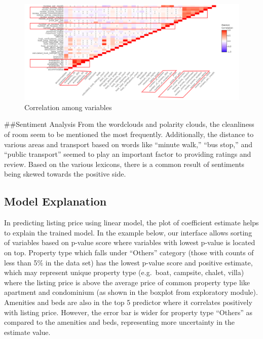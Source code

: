 \documentclass{acm_proc_article-sp}
\begin{document}
\begin{figure}[H]

{\centering \includegraphics[width=1\linewidth]{images/corrcase} 

}

\caption{Correlation among variables}\label{fig:unnamed-chunk-20}
\end{figure}

\#\#Sentiment Analysis From the wordclouds and polarity clouds, the
cleanliness of room seem to be mentioned the most frequently.
Additionally, the distance to various areas and transport based on words
like ``minute walk,'' ``bus stop,'' and ``public transport'' seemed to
play an important factor to providing ratings and review. Based on the
various lexicons, there is a common result of sentiments being skewed
towards the positive side.

\hypertarget{model-explanation}{%
\subsection{Model Explanation}\label{model-explanation}}

In predicting listing price using linear model, the plot of coefficient
estimate helps to explain the trained model. In the example below, our
interface allows sorting of variables based on p-value score where
variables with lowest p-value is located on top. Property type which
falls under ``Others'' category (those with counts of less than 5\% in
the data set) has the lowest p-value score and positive estimate, which
may represent unique property type (e.g.~boat, campsite, chalet, villa)
where the listing price is above the average price of common property
type like apartment and condominium (as shown in the boxplot from
exploratory module). Amenities and beds are also in the top 5 predictor
where it correlates positively with listing price. However, the error
bar is wider for property type ``Others'' as compared to the amenities
and beds, representing more uncertainty in the estimate value.
\end{document}
